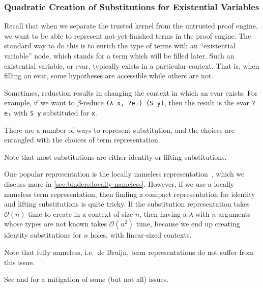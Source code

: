 \subsubsection{Quadratic Creation of Substitutions for Existential Variables} \label{sec:perf:quadratic-evar-subst}
Recall  that when we separate the trusted kernel from the untrusted proof engine, we want to be able to represent not-yet-finished terms in the proof engine.
The standard way to do this is to enrich the type of terms with an ``existential variable'' node, which stands for a term which will be filled later.
%
Such an existential variable, or evar, typically exists in a particular context.
That is, when filling an evar, some hypotheses are accessible while others are not.

Sometimes, reduction results in changing the context in which an evar exists.
For example, if we want to $\beta$-reduce \texttt{(λ x, ?e₁) (S y)}, then the result is the evar \texttt{?e₁} with \texttt{S y} substituted for \texttt{x}.

There are a number of ways to represent substitution, and the choices are entangled with the choices of term representation.

Note that most substitutions are either identity or lifting substitutions.
%

One popular representation is the locally nameless representation~\cite{Locally2012Chargueraud,locally2007Leroy}, which we discuss more in \autoref{sec:binders:locally-nameless}.
%
However, if we use a locally nameless term representation, then finding a compact representation for identity and lifting substitutions is quite tricky.
If the substitution representation takes $\mathcal O(n)$ time to create in a context of size $n$, then having a $\lambda$ with $n$ arguments whose types are not known takes $\mathcal O(n^2)$ time, because we end up creating identity substitutions for $n$ holes, with linear-sized contexts.

Note that fully nameless, i.e.\ de Bruijn, term representations do not suffer from this issue.

See  and  for a mitigation of some (but not all) issues.

